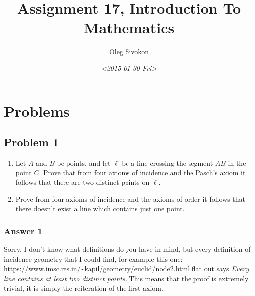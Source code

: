 \documentclass[11pt]{article}
\author{Oleg Sivokon}
\date{\textit{<2015-01-30 Fri>}}
\title{Assignment 17, Introduction To Mathematics}
\begin{document}
\maketitle
\tableofcontents



\clearpage

\section{Problems}
\label{sec-1}

\subsection{Problem 1}
\label{sec-1-1}
\begin{enumerate}
\item Let $A$ and $B$ be points, and let $\ell$ be a line crossing the segment
$AB$ in the point $C$.  Prove that from four axioms of incidence and the
Pasch's axiom it follows that there are two distinct points on $\ell$.
\item Prove from four axioms of incidence and the axioms of order it follows
that there doesn't exist a line which contains just one point.
\end{enumerate}

\subsubsection{Answer 1}
\label{sec-1-1-1}
Sorry, I don't know what definitions do you have in mind, but every
definition of incidence geometry that I could find, for example this one:
\url{https://www.imsc.res.in/~kapil/geometry/euclid/node2.html} flat out says
\emph{Every line contains at least two distinct points.} This means that the
proof is extremely trivial, it is simply the reiteration of the first
axiom.
\end{document}
